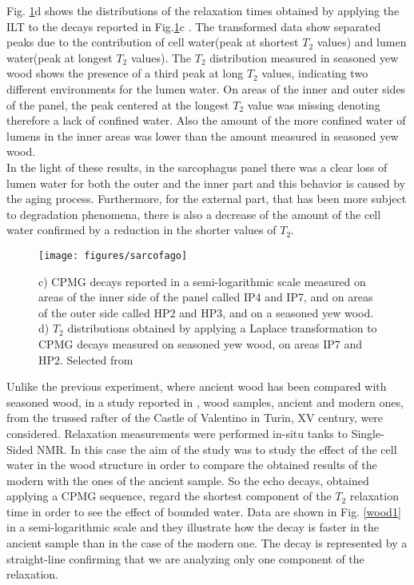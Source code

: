 \documentclass[a4paper,11pt]{report}
\begin{document}
Fig. \ref{sarcofago}d shows the distributions of the relaxation times obtained by applying the ILT to the decays reported in Fig.\ref{sarcofago}c .
The transformed data show separated peaks due to the contribution of cell water(peak at shortest $T_2$ values) and lumen water(peak at longest $T_2$ values). The $T_2$ distribution measured in seasoned yew wood shows the presence of a third peak at long $T_2$ values, indicating two different environments for the lumen water. On areas of the inner and outer sides of the panel, the peak centered at the longest $T_2$ value was missing denoting therefore a lack of confined water. Also the amount of the more confined water of lumens in the inner areas was lower than the amount measured in seasoned yew wood.\\
In the light of these results, in the sarcophagus panel there was a clear loss of lumen water for both the outer and the inner part and this behavior is caused by the aging process. Furthermore, for the external part, that has been more subject to degradation phenomena, there is also a decrease of the amount of the cell water confirmed by a reduction in the shorter values of $T_2$.\\
\begin{figure}[h]
	\centering
	\texttt{[image: figures/sarcofago]}
	\caption{c) CPMG decays reported in a semi-logarithmic scale measured on areas of the inner side of the panel called IP4 and IP7, and on areas of the outer side called HP2 and HP3, and on a seasoned yew wood. d) $T_2$ distributions obtained by applying a Laplace transformation to CPMG decays measured on seasoned yew wood, on areas IP7 and HP2. Selected from \cite{trewood} }\label{sarcofago}
\end{figure}
Unlike the previous experiment, where ancient wood has been compared with seasoned wood, in a study reported in \cite{quattrowood} ,  wood samples, ancient and modern ones, from the trussed rafter of the Castle of Valentino in Turin, XV century, were considered. Relaxation measurements were performed in-situ tanks to Single-Sided NMR.
In this case the aim of the study was to study the effect of the cell water in the wood structure in order to compare the obtained results of the modern with the ones of the ancient sample.
So the echo decays, obtained applying a CPMG sequence, regard the shortest component of the $T_2$ relaxation time in order to see the effect of bounded water. Data are shown in Fig. \ref{wood1} in a semi-logarithmic scale and they illustrate how the decay is faster in the ancient sample than in the case of the modern one. The decay is represented by a straight-line confirming that we are analyzing only one component of the relaxation.
\end{document}
